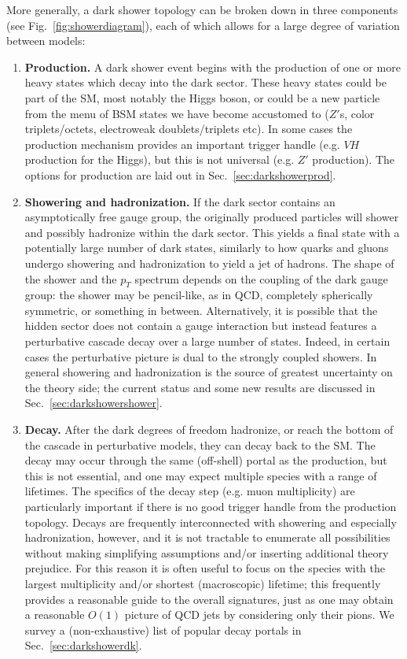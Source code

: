 More generally, a dark shower topology can be broken down in three components (see Fig.~\ref{fig:showerdiagram}), each of which allows for a large degree of variation between models:
\begin{enumerate}
\item \textbf{Production.} A dark shower event begins with the production of one or more heavy states which decay into the dark sector. These heavy states could be part of the SM, most notably the Higgs boson, or could be a new particle from the menu of BSM states we have become accustomed to ($Z'$s, color triplets/octets, electroweak doublets/triplets etc). In some cases the production mechanism provides an important trigger handle (e.g. $VH$  production for the Higgs), but this is not universal (e.g. $Z'$ production). The options for production are laid out in Sec.~\ref{sec:darkshowerprod}.

\item \textbf{Showering and hadronization.} If the dark sector contains an asymptotically free gauge group, the originally produced particles will shower and possibly hadronize within the dark sector. This yields a final state with a potentially large number of dark states, similarly to how quarks and gluons undergo showering and hadronization to yield a jet of hadrons. The shape of the shower and the $p_T$ spectrum depends on the coupling of the dark gauge group: the shower may be pencil-like, as in QCD, completely spherically symmetric, or something in between. Alternatively, it is possible that the hidden sector does not contain a gauge interaction but instead features a perturbative cascade decay over a large number of states. Indeed, in certain cases the perturbative picture is dual to the strongly coupled showers. In general showering and hadronization is the source of greatest uncertainty on the theory side; the current status and some new results are discussed in Sec.~\ref{sec:darkshowershower}.

\item \textbf{Decay.} After the dark degrees of freedom hadronize, or reach the bottom of the cascade in perturbative models, they can decay back to the SM. The decay may occur through the same (off-shell) portal as the production, but this is not essential, and one may expect multiple species with a range of lifetimes. The specifics of the decay step (e.g. muon multiplicity) are particularly important if there is no good trigger handle from the production topology. Decays are frequently interconnected with showering and especially hadronization, however, and it is not tractable to enumerate all possibilities without making simplifying assumptions and/or inserting additional theory prejudice. For this reason it is often useful to focus on the species with the largest multiplicity and/or shortest (macroscopic) lifetime; this frequently provides a reasonable guide to the overall signatures, just as one may obtain a reasonable $O(1)$ picture of QCD jets by considering only their pions. We survey a (non-exhaustive) list of popular decay portals in Sec.~\ref{sec:darkshowerdk}.




\end{enumerate}
